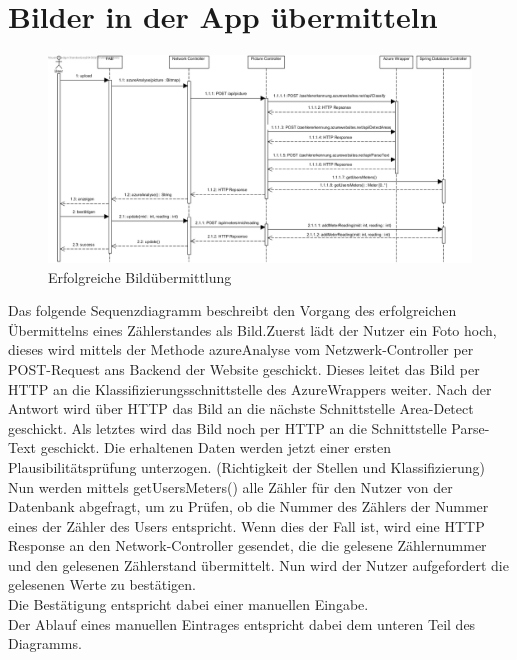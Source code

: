 \section{Bilder in der App übermitteln}
\begin{figure}[H]
	\centering
	\includegraphics[width=16cm]{img/diagrams/SubmitFotoSequence}
	\caption{Erfolgreiche Bildübermittlung}
\end{figure}
Das folgende Sequenzdiagramm beschreibt den Vorgang des erfolgreichen Übermittelns eines Zählerstandes als Bild.Zuerst lädt der Nutzer ein Foto hoch, dieses wird mittels der Methode azureAnalyse vom Netzwerk-Controller per POST-Request ans Backend der Website geschickt. Dieses leitet das Bild per HTTP an die Klassifizierungsschnittstelle des AzureWrappers weiter. Nach der Antwort wird über HTTP das Bild an die nächste Schnittstelle Area-Detect geschickt. Als letztes wird das Bild noch per HTTP an die Schnittstelle Parse-Text geschickt. Die erhaltenen Daten werden jetzt einer ersten Plausibilitätsprüfung unterzogen. (Richtigkeit der Stellen und Klassifizierung)\\
Nun werden mittels getUsersMeters() alle Zähler für den Nutzer von der Datenbank abgefragt, um zu Prüfen, ob die Nummer des Zählers der Nummer eines der Zähler des Users entspricht.
Wenn dies der Fall ist, wird eine HTTP Response an den Network-Controller gesendet, die die gelesene Zählernummer und den gelesenen Zählerstand übermittelt. Nun wird der Nutzer aufgefordert die gelesenen Werte zu bestätigen. \\
Die Bestätigung entspricht dabei einer manuellen Eingabe.\\
Der Ablauf eines manuellen Eintrages entspricht dabei dem unteren Teil des Diagramms.

